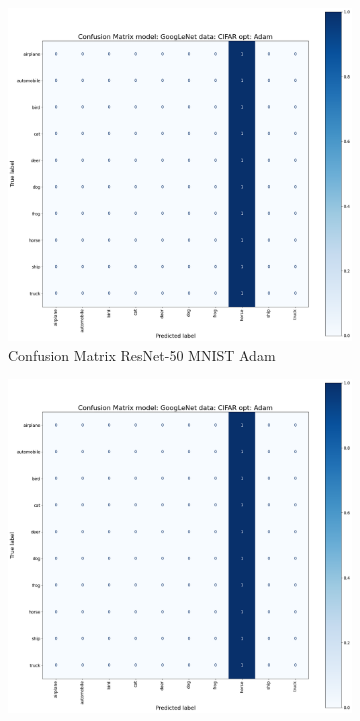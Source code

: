 \documentclass[conference]{IEEEtran}
\begin{document}
\begin{figure}[!htbp]
    \centering
    \begin{subfigure}[b]{0.22\textwidth}
        \centering
        \includegraphics[width=\textwidth]{img/matrix_sample.png}
        \caption{Confusion Matrix ResNet-50 MNIST Adam}
        \label{fig:x imatrix_ResNet_MNIST_Adam}
    \end{subfigure}
    \hfill
    \begin{subfigure}[b]{0.22\textwidth}
        \centering
        \includegraphics[width=\textwidth]{img/matrix_sample.png}

\end{subfigure}
\end{figure}
\end{document}
